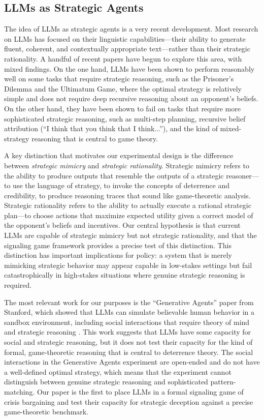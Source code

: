 \documentclass[12pt]{article}
\theoremstyle{plain}
\theoremstyle{definition}
\begin{document}
\subsection{LLMs as Strategic Agents}

The idea of LLMs as strategic agents is a very recent development. Most research on LLMs has focused on their linguistic capabilities---their ability to generate fluent, coherent, and contextually appropriate text---rather than their strategic rationality. A handful of recent papers have begun to explore this area, with mixed findings. On the one hand, LLMs have been shown to perform reasonably well on some tasks that require strategic reasoning, such as the Prisoner's Dilemma and the Ultimatum Game, where the optimal strategy is relatively simple and does not require deep recursive reasoning about an opponent's beliefs. On the other hand, they have been shown to fail on tasks that require more sophisticated strategic reasoning, such as multi-step planning, recursive belief attribution (``I think that you think that I think...''), and the kind of mixed-strategy reasoning that is central to game theory.

A key distinction that motivates our experimental design is the difference between \textit{strategic mimicry} and \textit{strategic rationality}. Strategic mimicry refers to the ability to produce outputs that resemble the outputs of a strategic reasoner---to use the language of strategy, to invoke the concepts of deterrence and credibility, to produce reasoning traces that sound like game-theoretic analysis. Strategic rationality refers to the ability to actually execute a rational strategic plan---to choose actions that maximize expected utility given a correct model of the opponent's beliefs and incentives. Our central hypothesis is that current LLMs are capable of strategic mimicry but not strategic rationality, and that the signaling game framework provides a precise test of this distinction. This distinction has important implications for policy: a system that is merely mimicking strategic behavior may appear capable in low-stakes settings but fail catastrophically in high-stakes situations where genuine strategic reasoning is required.

The most relevant work for our purposes is the ``Generative Agents'' paper from Stanford, which showed that LLMs can simulate believable human behavior in a sandbox environment, including social interactions that require theory of mind and strategic reasoning \citep{Park2023}. This work suggests that LLMs have some capacity for social and strategic reasoning, but it does not test their capacity for the kind of formal, game-theoretic reasoning that is central to deterrence theory. The social interactions in the Generative Agents experiment are open-ended and do not have a well-defined optimal strategy, which means that the experiment cannot distinguish between genuine strategic reasoning and sophisticated pattern-matching. Our paper is the first to place LLMs in a formal signaling game of crisis bargaining and test their capacity for strategic deception against a precise game-theoretic benchmark.
\end{document}

